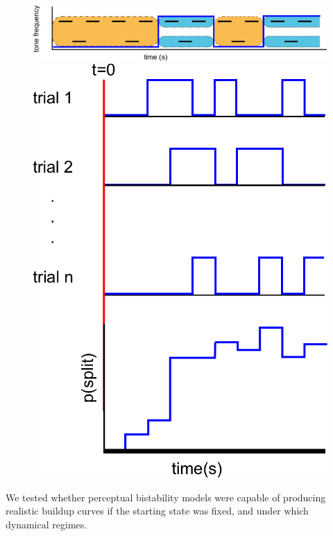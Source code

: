 \documentclass[10pt]{article}
\begin{document}
\begin{figure}
	\centering
	\includegraphics[scale=0.35]{../percepts_timecourse_binary}
	\includegraphics[scale=0.5]{../TrialAvg}
	\caption{}
	\label{fig:TrialAvg}
\end{figure}

We tested whether perceptual bistability models were capable of producing realistic buildup curves if the starting state was fixed, and under which dynamical regimes.
\cite{Shpiro2009}
\end{document}

